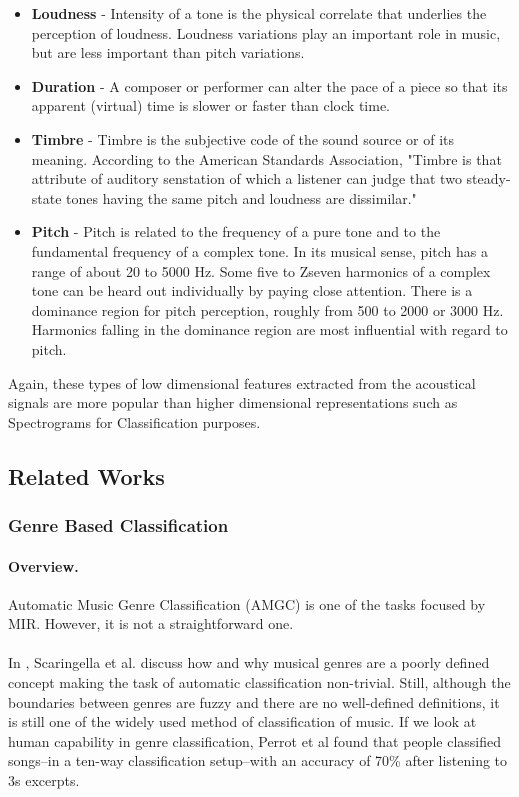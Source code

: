 \begin{itemize}
        \item \textbf{Loudness} - Intensity of a tone is the physical correlate that underlies the perception of loudness. Loudness variations play an important role in music, but are less important than pitch variations.

        \item \textbf{Duration} - A composer or performer can alter the pace of a piece so that its apparent (virtual) time is slower or faster than clock time. 

        \item \textbf{Timbre} - Timbre is the subjective code of the sound source or of its meaning. According to the American Standards Association, "Timbre
                is that attribute of auditory senstation of which a listener can judge that two steady-state tones having the same pitch and loudness are dissimilar."

        \item \textbf{Pitch} - Pitch is related to the frequency of a pure tone and to the fundamental frequency of a complex tone. In its musical sense, pitch
                has a range of about 20 to 5000 Hz. Some five to Zseven harmonics of a complex tone can be heard out individually by paying close attention. There
                is a dominance region for pitch perception, roughly from 500 to 2000 or 3000 Hz. Harmonics falling in the dominance region are most influential 
                with regard to pitch.

\end{itemize}

Again, these types of low dimensional features extracted from the acoustical signals are more popular than higher dimensional representations such as
Spectrograms for Classification purposes. \cite{prasad2007}

\subsection{Related Works}
\subsubsection{Genre Based Classification}

\paragraph{Overview.}
Automatic Music Genre Classification (AMGC) is one of the tasks focused by MIR. However, it is not a straightforward one.\\
\\
In \cite{Scaringella2006}, Scaringella et al. discuss how and why musical genres are a poorly defined concept making the task of automatic classification non-trivial.
Still, although the boundaries between genres are fuzzy and there are no well-defined definitions, it is still one of the widely used method of classification of music. 
If we look at human capability in genre classification, Perrot et al \cite{Perrot1999} found that people classified songs--in a ten-way classification setup--with an accuracy of 70\% after listening to 3s excerpts.

